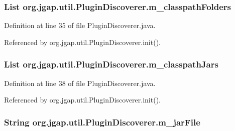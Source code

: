\hypertarget{classorg_1_1jgap_1_1util_1_1_plugin_discoverer_a323a9570d75ed8205d69d8f5c785bb73}{
\subsubsection[{m\-\_\-classpath\-Folders}]{\setlength{\rightskip}{0pt plus 5cm}List org.\-jgap.\-util.\-Plugin\-Discoverer.\-m\-\_\-classpath\-Folders\hspace{0.3cm}{\ttfamily [private]}}}\label{classorg_1_1jgap_1_1util_1_1_plugin_discoverer_a323a9570d75ed8205d69d8f5c785bb73}


Definition at line 35 of file Plugin\-Discoverer.\-java.



Referenced by org.\-jgap.\-util.\-Plugin\-Discoverer.\-init().

\hypertarget{classorg_1_1jgap_1_1util_1_1_plugin_discoverer_a8ec8f977e92750122b6a67780238e8e2}{
\subsubsection[{m\-\_\-classpath\-Jars}]{\setlength{\rightskip}{0pt plus 5cm}List org.\-jgap.\-util.\-Plugin\-Discoverer.\-m\-\_\-classpath\-Jars\hspace{0.3cm}{\ttfamily [private]}}}\label{classorg_1_1jgap_1_1util_1_1_plugin_discoverer_a8ec8f977e92750122b6a67780238e8e2}


Definition at line 38 of file Plugin\-Discoverer.\-java.



Referenced by org.\-jgap.\-util.\-Plugin\-Discoverer.\-init().

\hypertarget{classorg_1_1jgap_1_1util_1_1_plugin_discoverer_a5b6575c6f464171001c919aa23944fec}{
\subsubsection[{m\-\_\-jar\-File}]{\setlength{\rightskip}{0pt plus 5cm}String org.\-jgap.\-util.\-Plugin\-Discoverer.\-m\-\_\-jar\-File\hspace{0.3cm}{\ttfamily [private]}}}\label{classorg_1_1jgap_1_1util_1_1_plugin_discoverer_a5b6575c6f464171001c919aa23944fec}


